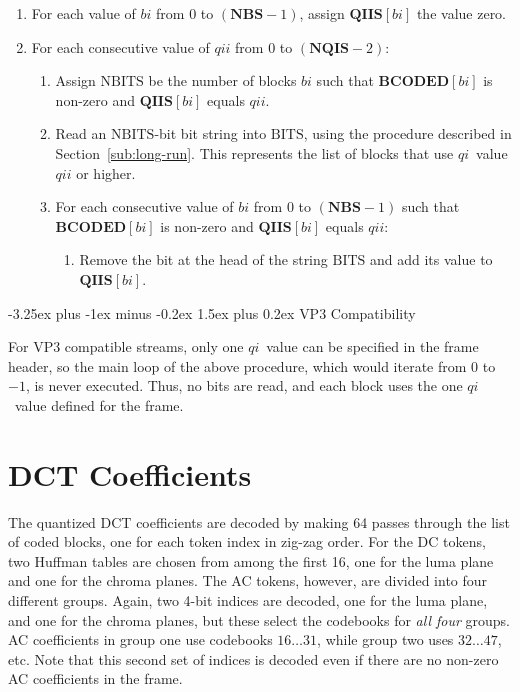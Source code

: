 \documentclass[9pt,letterpaper]{book}
\makeatletter
\newcommand{\idx}[1]{{\ensuremath{\mathit{#1}}}}
\newcommand{\qi}{\idx{qi}}
\newcommand{\bi}{\idx{bi}}
\newcommand{\qii}{\idx{qii}}
\newcommand{\bitvar}[1]{\ensuremath{\mathbf{\bm{#1}}}}
\newcommand{\locvar}[1]{\ensuremath{\mathrm{#1}}}
\numberwithin{equation}{chapter}
\numberwithin{figure}{chapter}
\numberwithin{table}{chapter}
\renewcommand{\paragraph}{\@startsection{paragraph}{4}{0ex}%
 {-3.25ex plus -1ex minus -0.2ex}%
 {1.5ex plus 0.2ex}%
 {\normalfont\normalsize\bfseries}}
\makeatother
\begin{document}
\begin{enumerate}
\item
For each value of \locvar{\bi} from 0 to $(\bitvar{NBS}-1)$, assign
 $\bitvar{QIIS}[\locvar{\bi}]$ the value zero.
\item
For each consecutive value of \locvar{\qii} from 0 to $(\bitvar{NQIS}-2)$:
\begin{enumerate}
\item
Assign \locvar{NBITS} be the number of blocks \locvar{\bi} such that
 $\bitvar{BCODED}[\locvar{\bi}]$ is non-zero and $\bitvar{QIIS}[\locvar{\bi}]$
 equals $\locvar{\qii}$.
\item
Read an \locvar{NBITS}-bit bit string into \locvar{BITS}, using the procedure
 described in Section~\ref{sub:long-run}.
This represents the list of blocks that use \qi\ value \locvar{\qii} or higher.
\item
For each consecutive value of \locvar{\bi} from 0 to $(\bitvar{NBS}-1)$ such
 that $\bitvar{BCODED}[\locvar{\bi}]$ is non-zero and
 $\bitvar{QIIS}[\locvar{\bi}]$ equals $\locvar{\qii}$:
\begin{enumerate}
\item
Remove the bit at the head of the string \locvar{BITS} and add its value to
 $\bitvar{QIIS}[\locvar{\bi}]$.
\end{enumerate}
\end{enumerate}
\end{enumerate}

\paragraph{VP3 Compatibility}

For VP3 compatible streams, only one \qi\ value can be specified in the frame
 header, so the main loop of the above procedure, which would iterate from $0$
 to $-1$, is never executed.
Thus, no bits are read, and each block uses the one \qi\ value defined for the
 frame.

\cleardoublepage

\section{DCT Coefficients}
\label{sec:dct-decode}

The quantized DCT coefficients are decoded by making 64 passes through the list
 of coded blocks, one for each token index in zig-zag order.
For the DC tokens, two Huffman tables are chosen from among the first 16, one
 for the luma plane and one for the chroma planes.
The AC tokens, however, are divided into four different groups.
Again, two 4-bit indices are decoded, one for the luma plane, and one for the
 chroma planes, but these select the codebooks for {\em all four} groups.
AC coefficients in group one use codebooks $16\ldots 31$, while group two uses
 $32\ldots 47$, etc.
Note that this second set of indices is decoded even if there are no non-zero
 AC coefficients in the frame.
\end{document}

